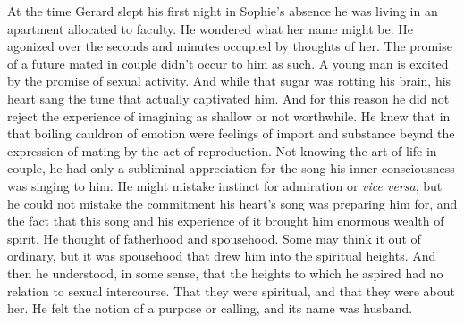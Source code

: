 At the time Gerard slept his first night in Sophie's absence he was
living in an apartment allocated to faculty.  He wondered what her
name might be.  He agonized over the seconds and minutes occupied by
thoughts of her.  The promise of a future mated in couple didn't occur
to him as such.  A young man is excited by the promise of sexual
activity.  And while that sugar was rotting his brain, his heart sang
the tune that actually captivated him.  And for this reason he did not
reject the experience of imagining as shallow or not worthwhile.  He
knew that in that boiling cauldron of emotion were feelings of import
and substance beynd the expression of mating by the act of
reproduction.  Not knowing the art of life in couple, he had only a
subliminal appreciation for the song his inner consciousness was
singing to him.  He might mistake instinct for admiration or {\it vice
versa}, but he could not mistake the commitment his heart's song was
preparing him for, and the fact that this song and his experience of
it brought him enormous wealth of spirit.  He thought of fatherhood
and spousehood.  Some may think it out of ordinary, but it was
spousehood that drew him into the spiritual heights.  And then he
understood, in some sense, that the heights to which he aspired had no
relation to sexual intercourse.  That they were spiritual, and that
they were about her.  He felt the notion of a purpose or calling, and
its name was husband.



